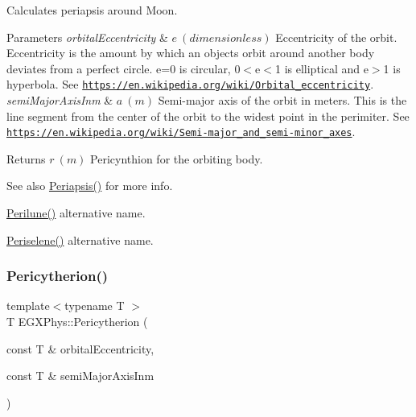 Calculates periapsis around Moon. 


\begin{DoxyParams}{Parameters}
{\em orbital\+Eccentricity} & $ e\ (dimensionless)$ Eccentricity of the orbit. Eccentricity is the amount by which an objects orbit around another body deviates from a perfect circle. e=0 is circular, 0$<$e$<$1 is elliptical and e$>$1 is hyperbola. See \href{https://en.wikipedia.org/wiki/Orbital_eccentricity}{\tt https\+://en.\+wikipedia.\+org/wiki/\+Orbital\+\_\+eccentricity}. \\
\hline
{\em semi\+Major\+Axis\+Inm} & $ a\ (m)$ Semi-\/major axis of the orbit in meters. This is the line segment from the center of the orbit to the widest point in the perimiter. See \href{https://en.wikipedia.org/wiki/Semi-major_and_semi-minor_axes}{\tt https\+://en.\+wikipedia.\+org/wiki/\+Semi-\/major\+\_\+and\+\_\+semi-\/minor\+\_\+axes}. \\
\hline
\end{DoxyParams}
\begin{DoxyReturn}{Returns}
$ r\ (m)$ Pericynthion for the orbiting body. 
\end{DoxyReturn}
\begin{DoxySeeAlso}{See also}
\mbox{\hyperlink{group___e_g_x_phys-_periapsis_gad487212733711bc2ce73c8137c9309c3}{Periapsis()}} for more info. 

\mbox{\hyperlink{group___e_g_x_phys-_periapsis_gac305fe72a19c1126bc7e72ef1de873a0}{Perilune()}} alternative name. 

\mbox{\hyperlink{group___e_g_x_phys-_periapsis_ga91c6e1f3b6f98fe053bec87efcff4364}{Periselene()}} alternative name. 
\end{DoxySeeAlso}
\mbox{\label{group___e_g_x_phys-_periapsis_ga8abbd484b4a6e0958000c91644cbb8ee}} 
\subsubsection{\texorpdfstring{Pericytherion()}{Pericytherion()}}
{\footnotesize\ttfamily template$<$typename T $>$ \\
T E\+G\+X\+Phys\+::\+Pericytherion (\begin{DoxyParamCaption}\item[{const T \&}]{orbital\+Eccentricity,  }\item[{const T \&}]{semi\+Major\+Axis\+Inm }\end{DoxyParamCaption})}




